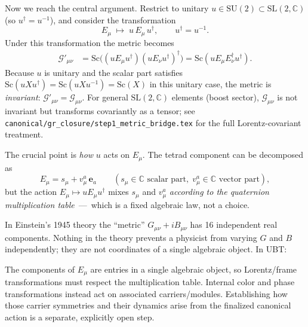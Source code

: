 \documentclass[12pt,a4paper]{article}
\theoremstyle{definition}
\theoremstyle{remark}
\begin{document}
Now we reach the central argument.  Restrict to unitary
$u\in\mathrm{SU}(2)\subset\mathrm{SL}(2,\mathbb{C})$ (so $u^\dagger=u^{-1}$),
and consider the transformation
\begin{equation}
  E_\mu \;\mapsto\; u\,E_\mu\,u^\dagger,
  \qquad u^\dagger=u^{-1}.
\end{equation}
Under this transformation the metric becomes
\begin{align}
  \mathcal{G}'_{\mu\nu}
  &= \mathrm{Sc}\bigl((uE_\mu u^\dagger)(uE_\nu u^\dagger)^{\dagger}\bigr)
   = \mathrm{Sc}(u E_\mu E_\nu^\dagger u^\dagger).
\end{align}
Because $u$ is unitary and the scalar part satisfies
$\mathrm{Sc}(uXu^\dagger) = \mathrm{Sc}(uXu^{-1}) = \mathrm{Sc}(X)$ in this
unitary case, the metric is \emph{invariant}:
$\mathcal{G}'_{\mu\nu} = \mathcal{G}_{\mu\nu}$.  For general
$\mathrm{SL}(2,\mathbb{C})$ elements (boost sector), $\mathcal{G}_{\mu\nu}$
is not invariant but transforms covariantly as a tensor; see
\texttt{canonical/gr\_closure/step1\_metric\_bridge.tex} for the full
Lorentz-covariant treatment.

The crucial point is \emph{how} $u$ acts on $E_\mu$.  The tetrad component
can be decomposed as
\begin{equation}
  E_\mu = s_\mu + v_\mu^a\,\mathbf{e}_a
  \qquad
  (s_\mu\in\mathbb{C}\text{ scalar part},\;
   v_\mu^a\in\mathbb{C}\text{ vector part}),
\end{equation}
but the action $E_\mu\mapsto uE_\mu u^\dagger$ mixes $s_\mu$ and $v_\mu^a$
\emph{according to the quaternion multiplication table}~---~which is a fixed
algebraic law, not a choice.

In Einstein's 1945 theory the ``metric'' $G_{\mu\nu}+iB_{\mu\nu}$ has 16
independent real components.  Nothing in the theory prevents a physicist from
varying $G$ and $B$ independently; they are not coordinates of a single
algebraic object.  In UBT:

\begin{keybox}
  The components of $E_\mu$ are entries in a single algebraic object, so
  Lorentz/frame transformations must respect the multiplication table.  Internal
  color and phase transformations instead act on associated carriers/modules.
  Establishing how those carrier symmetries and their dynamics arise from the
  finalized canonical action is a separate, explicitly open step.
\end{keybox}

\end{document}
